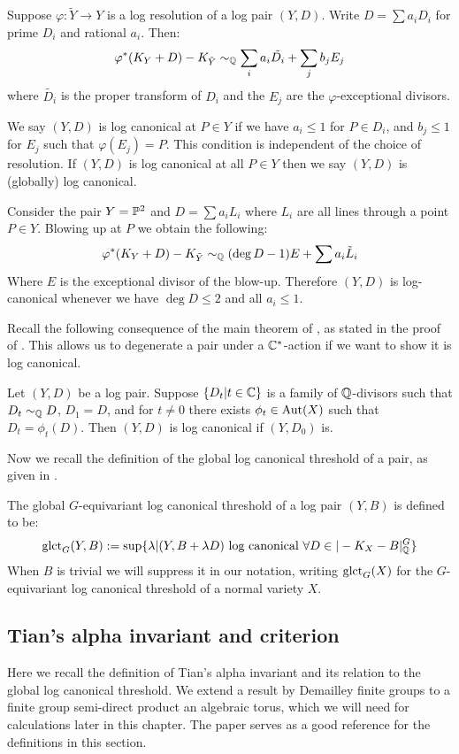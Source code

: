 Suppose \(\varphi: \tilde{Y} \to Y\) is a log resolution of a log pair \((Y,D)\). Write \(D = \sum a_i D_i\) for prime \(D_i\) and rational \(a_i\). Then:
\[
\varphi^*(K_Y+ D) - K_{\tilde{Y}}\sim_{\mathbb{Q}} \sum_i a_i \tilde{D_i} + \sum_j b_j E_j
\]
where \(\tilde{D_i}\) is the proper transform of \(D_i\) and the \(E_j\) are the \(\varphi\)-exceptional divisors. 
\begin{definition}
We say \((Y,D)\) is log canonical at \(P \in Y\) if we have \(a_i \le 1 \) for \(P \in D_i\), and \(b_j \le 1\) for \(E_j\) such that \(\varphi(E_j) = P\). This condition is independent of the choice of resolution. If \((Y,D)\) is log canonical at all \(P  \in Y\) then we say \((Y,D)\) is (globally) log canonical.
\end{definition}
\begin{example} \label{examplelct}
Consider the pair \(Y = \mathbb{P}^2\) and \(D = \sum a_i L_i\) where \(L_i\) are all lines through a point \(P \in Y\). Blowing up at \(P\) we obtain the following:
\[
\varphi^*(K_Y+D) - K_{\tilde{Y}} \sim_{\mathbb{Q}} (\deg D - 1) E + \sum a_i \tilde{L}_i
\]
Where \(E\) is the exceptional divisor  of the blow-up. Therefore \((Y,D)\) is log-canonical whenever we have \(\deg D \le 2\) and all \(a_i \le 1\).
\end{example}
Recall the following consequence of the main theorem of \cite{demailly2001}, as stated in the proof of \cite[Lemma 5.1]{cheltsov08}. This allows us to degenerate a pair under a \(\mathbb{C}^*\)-action if we want to show it is log canonical.
\begin{lemma} \label{degenpair}
Let \((Y,D)\) be a log pair. Suppose \(\{ D_t | t \in \mathbb{C}\}\) is a family of \(\mathbb{Q}\)-divisors such that \(D_t \sim_{\mathbb{Q}} D\), \(D_1 = D\), and for \(t \neq 0\) there exists \(\phi_t \in \mathop{\rm Aut}\nolimits(X)\) such that \(D_t = \phi_t(D)\). Then \((Y,D)\) is log canonical if \((Y,D_0)\) is.
\end{lemma}
Now we recall the definition of the global log canonical threshold of a pair, as given in \cite{suess18-2}.
\begin{definition}
The global \(G\)-equivariant log canonical threshold of a log pair \((Y,B)\)  is defined to be:
\[
\operatorname{glct}_{G}(Y,B) := \sup \{ \lambda | (Y,B+ \lambda D) \text{ log canonical } \forall D \in | -K_X - B |_{\mathbb{Q}}^G \}
\]
When \(B\) is trivial we will suppress it in our notation, writing \(\operatorname{glct}_G(X)\) for the \(G\)-equivariant log canonical threshold of a normal variety \(X\).
\end{definition}
\subsection{Tian's alpha invariant and criterion} \label{prelim:alphainvariant}
Here we recall the definition of Tian's alpha invariant and its relation to the global log canonical threshold. We extend a result by Demailley finite groups to a finite group semi-direct product an algebraic torus, which we will need for calculations later in this chapter. The paper \cite{cheltsov08} serves as a good reference for the definitions in this section.

